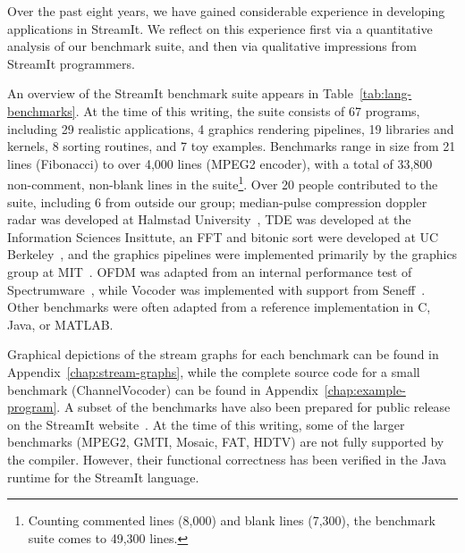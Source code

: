 Over the past eight years, we have gained considerable experience in
developing applications in StreamIt.  We reflect on this experience
first via a quantitative analysis of our benchmark suite, and then via
qualitative impressions from StreamIt programmers.

An overview of the StreamIt benchmark suite appears in
Table~\ref{tab:lang-benchmarks}.  At the time of this writing, the
suite consists of 67 programs, including 29 realistic applications, 4
graphics rendering pipelines, 19 libraries and kernels, 8 sorting
routines, and 7 toy examples.  Benchmarks range in size from 21 lines
(Fibonacci) to over 4,000 lines (MPEG2 encoder), with a total of
33,800 non-comment, non-blank lines in the suite\footnote{Counting
commented lines (8,000) and blank lines (7,300), the benchmark suite
comes to 49,300 lines.}.  Over 20 people contributed to the suite,
including 6 from outside our group; median-pulse compression doppler
radar was developed at Halmstad University~\cite{ola-techrep}, TDE was
developed at the Information Sciences Insittute, an FFT and bitonic
sort were developed at UC Berkeley~\cite{mani-permutations}, and the
graphics pipelines were implemented primarily by the graphics group at
MIT~\cite{chen-graphics05}.  OFDM was adapted from an internal
performance test of Spectrumware~\cite{tennenhouse_spectrumware_1996},
while Vocoder was implemented with support from
Seneff~\cite{seneff80thesis}.  Other benchmarks were often adapted
from a reference implementation in C, Java, or MATLAB.

Graphical depictions of the stream graphs for each benchmark can be
found in Appendix~\ref{chap:stream-graphs}, while the complete source
code for a small benchmark (ChannelVocoder) can be found in
Appendix~\ref{chap:example-program}.  A subset of the benchmarks have
also been prepared for public release on the StreamIt
website~\cite{streamitweb}.  At the time of this writing, some of the
larger benchmarks (MPEG2, GMTI, Mosaic, FAT, HDTV) are not fully
supported by the compiler.  However, their functional correctness has
been verified in the Java runtime for the StreamIt language.

